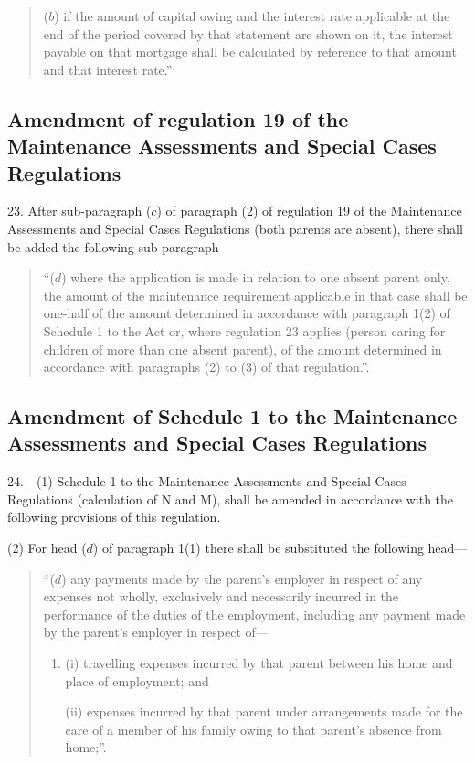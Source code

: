 \documentclass[12pt,a4paper]{article}
\begin{document}
\begin{quotation}
\begin{enumerate}
($b$) if the amount of capital owing and the interest rate applicable at the end of the period covered by that statement are shown on it, the interest payable on that mortgage shall be calculated by reference to that amount and that interest rate.”
\end{enumerate}
\end{quotation}

\subsection[23. Amendment of regulation 19 of the Maintenance Assessments and Special Cases Regulations]{Amendment of regulation 19 of the Maintenance Assessments and Special Cases Regulations}

23.  After sub-paragraph ($c$) of paragraph (2) of regulation 19 of the Maintenance Assessments and Special Cases Regulations (both parents are absent), there shall be added the following sub-paragraph—
\begin{quotation}
“($d$) where the application is made in relation to one absent parent only, the amount of the maintenance requirement applicable in that case shall be one-half of the amount determined in accordance with paragraph 1(2) of Schedule 1 to the Act or, where regulation 23 applies (person caring for children of more than one absent parent), of the amount determined in accordance with paragraphs (2) to (3) of that regulation.”.
\end{quotation}

\subsection[24. Amendment of Schedule 1 to the Maintenance Assessments and Special Cases Regulations]{Amendment of Schedule 1 to the Maintenance Assessments and Special Cases Regulations}

24.—(1) Schedule 1 to the Maintenance Assessments and Special Cases Regulations (calculation of N and M), shall be amended in accordance with the following provisions of this regulation.

(2) For head ($d$) of paragraph 1(1) there shall be substituted the following head—
\begin{quotation}
“($d$) any payments made by the parent’s employer in respect of any expenses not wholly, exclusively and necessarily incurred in the performance of the duties of the employment, including any payment made by the parent’s employer in respect of—
\begin{enumerate}\item[]
(i) travelling expenses incurred by that parent between his home and place of employment; and

(ii) expenses incurred by that parent under arrangements made for the care of a member of his family owing to that parent’s absence from home;”.
\end{enumerate}
\end{quotation}
\end{document}
